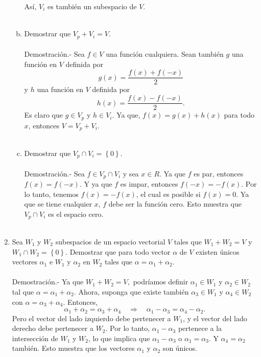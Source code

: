 \begin{enumerate}[\bfseries 1.]
\begin{enumerate}[(a)]
		Así, $V_i$ es también un subespacio de $V$.\\\\

	    \item Demostrar que $V_p + V_i=V$.\\\\
		Demostración.-\; Sea $f\in V$ una función cualquiera. Sean también $g$ una función en $V$ definida por 
		$$g(x)=\dfrac{f(x)+f(-x)}{2}$$
		y $h$ una función en $V$ definida por
		$$h(x)=\dfrac{f(x)-f(-x)}{2}.$$
		Es claro que $g\in V_p$ y $h\in V_i$. Ya que, $f(x)=g(x)+h(x)$ para todo $x$, entonces $V=V_p+V_i$.\\\\


	    \item Demostrar que $V_p \cap V_i=\left\{0\right\}$.\\\\
		Demostración.-\; Sea $f\in V_p\cap V_i$ y sea $x\in R$. Ya que $f$ es par, entonces $f(x)=f(-x)$. Y ya que $f$ es impar, entonces $f(-x)=-f(x)$. Por lo tanto, tenemos $f(x)=-f(x)$, el cual es posible si $f(x)=0.$ Ya que se tiene cualquier $x$, $f$ debe ser la función cero. Esto muestra que $V_p\cap V_i$ es el espacio cero.\\\\

	\end{enumerate}

    \item Sea $W_1$ y $W_2$ subespacios de un espacio vectorial $V$ tales que $W_1+W_2=V$ y $W_1\cap W_2=\left\{0\right\}.$ Demostrar que para todo vector $\alpha$ de $V$ existen únicos vectores $\alpha_1$ e $W_1$ y $\alpha_2$ en $W_2$ tales que $\alpha=\alpha_1+\alpha_2$.\\\\
	Demostración.-\; Ya que $W_1+W_2=V,$ podríamos definir $\alpha_1\in W_1$ y $\alpha_2\in W_2$ tal que $\alpha=\alpha_1+\alpha_2$. Ahora, suponga que existe también $\alpha_3\in W_1$ y $\alpha_4\in W_2$ con $\alpha=\alpha_3+\alpha_4$. Entonces,
	$$\alpha_1+\alpha_2=\alpha_3+\alpha_4 \quad \Rightarrow \quad \alpha_1-\alpha_3=\alpha_4-\alpha_2.$$
	Pero el vector del lado izquierdo debe pertenecer a $W_1$, y el vector del lado derecho debe pertenecer a $W_2$. Por lo tanto, $\alpha_1-\alpha_3$ pertenece a la intersección de $W_1$ y $W_2$, lo que implica que $\alpha_1-\alpha_3$ o $\alpha_1=\alpha_3$. Y $\alpha_4=\alpha_2$ también. Esto muestra que los vectores $\alpha_1$ y $\alpha_2$ son únicos.\\\\

\end{enumerate}


